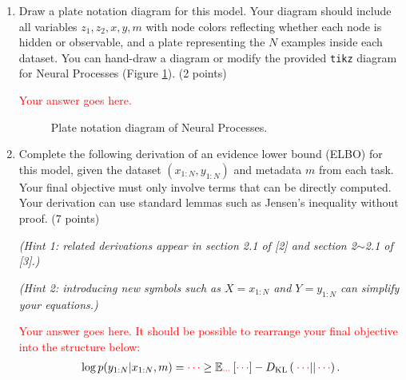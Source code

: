 \documentclass[12pt]{article}
\newcommand{\kld}[2]{D_{\mathrm{KL}} \left( \left. \left. #1 \right|\right| #2 \right) }
\begin{document}
\begin{enumerate}[label=(\alph*)]
\item 
Draw a plate notation diagram for this model.
Your diagram should include all variables $z_1, z_2, x, y, m$ with node colors reflecting whether each node is hidden or observable, and a plate representing the $N$ examples inside each dataset.
You can hand-draw a diagram or modify the provided \texttt{tikz} diagram for Neural Processes (Figure \ref{fig:plate_np}).
(2 points)

\textcolor{red}{Your answer goes here.}

\begin{figure}
\centering
{}
\caption{ \label{fig:plate_np}
Plate notation diagram of Neural Processes.}
\end{figure}

\item 
Complete the following derivation of an evidence lower bound (ELBO) for this model, given the dataset $(x_{1:N}, y_{1:N})$ and metadata $m$ from each task.
Your final objective must only involve terms that can be directly computed.
Your derivation can use standard lemmas such as Jensen's inequality without proof.
(7 points)

\textit{\small (Hint 1: related derivations appear in section 2.1 of [2] and section 2$\sim$2.1 of [3].)}

\textit{\small (Hint 2: introducing new symbols such as $X=x_{1:N}$ and $Y=y_{1:N}$ can simplify your equations.)}

\textcolor{red}{Your answer goes here. It should be possible to rearrange your final objective into the structure below:}
\begin{align}
\log p(y_{1:N} | x_{1:N}, m)
= \textcolor{red}{\cdots}
\geq \mathbb{E}_{
\textcolor{red}{\cdots}
}
\left[ 
\textcolor{red}{\cdots}
\right] 
-\kld{\textcolor{red}{\cdots}}{\textcolor{red}{\cdots}}.
\end{align}
\end{enumerate}
\end{document}
